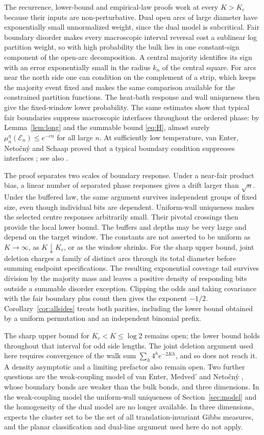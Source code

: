 The recurrence, lower-bound and empirical-law proofs work at every $K>K_c$ because their inputs are non-perturbative. Dual open arcs of large diameter have exponentially small unnormalized weight, since the dual model is subcritical. Fair boundary disorder makes every macroscopic interval reversal cost a sublinear log partition weight, so with high probability the bulk lies in one constant-sign component of the open-arc decomposition. A central majority identifies its sign with an error exponentially small in the radius $k_n$ of the central square. For arcs near the north side one can condition on the complement of a strip, which keeps the majority event fixed and makes the same comparison available for the constrained partition functions. The heat-bath response and wall uniqueness then give the fixed-window lower probability. The same estimates show that typical fair boundaries suppress macroscopic interfaces throughout the ordered phase: by Lemma~\ref{lem:long} and the summable bound \eqref{eq:H}, almost surely $\mu_n^\eta(\mathcal E_n)\le e^{-cn}$ for all large $n$. At sufficiently low temperature, van Enter, Neto\v cn\'y and Schaap proved that a typical boundary condition suppresses interfaces \cite[Theorem~4.1]{vENS05}; see also \cite[Remark~3.3]{vENS06}.

The proof separates two scales of boundary response. Under a near-fair product bias, a linear number of separated phase responses gives a drift larger than $\sqrt n$. Under the buffered law, the same argument survives independent groups of fixed size, even though individual bits are dependent. Uniform-wall uniqueness makes the selected centre responses arbitrarily small. Their pivotal crossings then provide the local lower bound. The buffers and depths may be very large and depend on the target window. The constants are not asserted to be uniform as $K\to\infty$, as $K\downarrow K_c$, or as the window shrinks. For the sharp upper bound, joint deletion charges a family of distinct arcs through its total diameter before summing endpoint specifications. The resulting exponential coverage tail survives division by the majority mass and leaves a positive density of responding bits outside a summable disorder exception. Clipping the odds and taking covariance with the fair boundary plus count then gives the exponent $-1/2$. Corollary~\ref{cor:allsides} treats both parities, including the lower bound obtained by a uniform permutation and an independent binomial prefix.

The sharp upper bound for $K_c<K\le\log2$ remains open; the lower bound holds throughout that interval for odd side lengths. The joint deletion argument used here requires convergence of the walk sum $\sum_h4^he^{-2Kh}$, and so does not reach it. A density asymptotic and a limiting prefactor also remain open. Two further questions are the weak-coupling model of van Enter, Medved' and Neto\v cn\'y \cite{EMN02}, whose boundary bonds are weaker than the bulk bonds, and three dimensions. In the weak-coupling model the uniform-wall uniqueness of Section~\ref{sec:model} and the homogeneity of the dual model are no longer available. In three dimensions, \cite[Remark~3.2]{vENS05} expects the cluster set to be the set of all translation-invariant Gibbs measures, and the planar classification and dual-line argument used here do not apply.